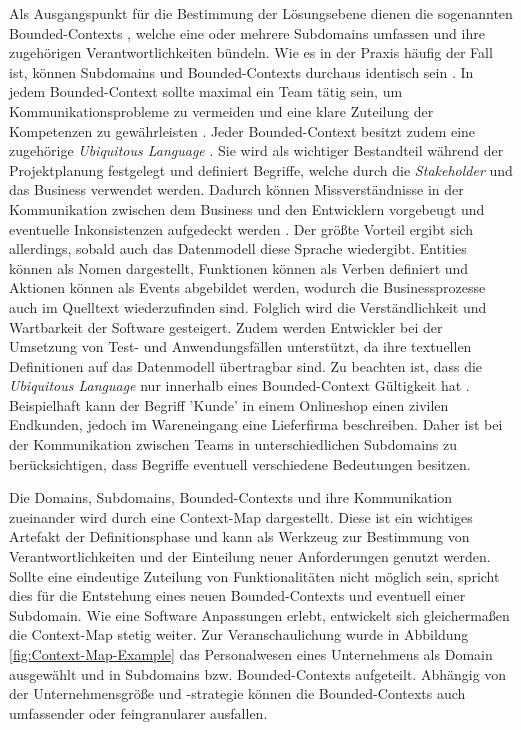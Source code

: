 Als Ausgangspunkt für die Bestimmung der Lösungsebene dienen die sogenannten Bounded-Contexts \cite[S. 57]{Vernon.2015}, welche eine oder mehrere Subdomains umfassen und ihre zugehörigen Verantwortlichkeiten bündeln. Wie es in der Praxis häufig der Fall ist, können Subdomains und Bounded-Contexts durchaus identisch sein \cite[S. 57]{Vernon.2015}. In jedem Bounded-Context sollte maximal ein Team tätig sein, um Kommunikationsprobleme zu vermeiden und eine klare Zuteilung der Kompetenzen zu gewährleisten \cite{Brandolini.2021}. Jeder Bounded-Context besitzt zudem eine zugehörige \emph{Ubiquitous Language} \cite[S. 62]{Vernon.2015}. Sie wird als wichtiger Bestandteil während der Projektplanung festgelegt und definiert Begriffe, welche durch die \emph{\Gls{Stakeholder}} und das Business verwendet werden. Dadurch können Missverständnisse in der Kommunikation zwischen dem Business und den Entwicklern vorgebeugt und eventuelle Inkonsistenzen aufgedeckt werden \cite[S. 336f.]{Evans.2011}. Der größte Vorteil ergibt sich allerdings, sobald auch das Datenmodell diese Sprache wiedergibt. Entities können als Nomen dargestellt, Funktionen können als Verben definiert und Aktionen können als Events abgebildet werden, wodurch die Businessprozesse auch im Quelltext wiederzufinden sind. Folglich wird die Verständlichkeit und Wartbarkeit der Software \cite[S. 24ff.]{Evans.2011} gesteigert. Zudem werden Entwickler bei der Umsetzung von Test- und Anwendungsfällen unterstützt, da ihre textuellen Definitionen auf das Datenmodell übertragbar sind. Zu beachten ist, dass die \emph{Ubiquitous Language} nur innerhalb eines Bounded-Context Gültigkeit hat \cite[S. 62]{Vernon.2015}. Beispielhaft kann der Begriff 'Kunde' in einem Onlineshop einen zivilen Endkunden, jedoch im Wareneingang eine Lieferfirma beschreiben. Daher ist bei der Kommunikation zwischen Teams in unterschiedlichen Subdomains zu berücksichtigen, dass Begriffe eventuell verschiedene Bedeutungen besitzen.

Die Domains, Subdomains, Bounded-Contexts und ihre Kommunikation zueinander wird durch eine Context-Map dargestellt. Diese ist ein wichtiges Artefakt der Definitionsphase und kann als Werkzeug zur Bestimmung von Verantwortlichkeiten und der Einteilung neuer Anforderungen genutzt werden. Sollte eine eindeutige Zuteilung von Funktionalitäten nicht möglich sein, spricht dies für die Entstehung eines neuen Bounded-Contexts und eventuell einer Subdomain. Wie eine Software Anpassungen erlebt, entwickelt sich gleichermaßen die Context-Map stetig weiter. \cite[S. 87ff]{Vernon.2015} Zur Veranschaulichung wurde in Abbildung \ref{fig:Context-Map-Example} das Personalwesen eines Unternehmens als Domain ausgewählt und in Subdomains bzw. Bounded-Contexts aufgeteilt. Abhängig von der Unternehmensgröße und -strategie können die Bounded-Contexts auch umfassender oder feingranularer ausfallen.

